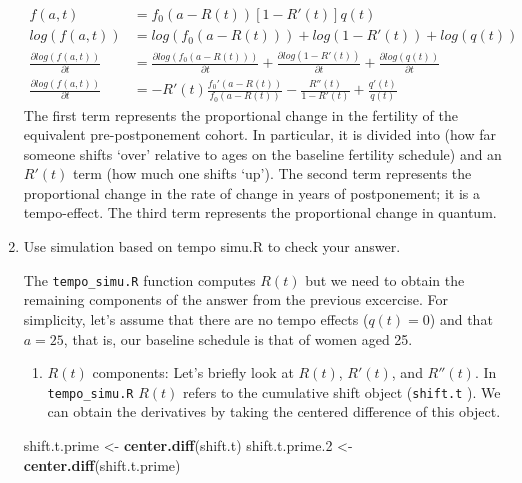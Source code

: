 \documentclass[]{book}
\newenvironment{Shaded}{\begin{snugshade}}{\end{snugshade}}
\newcommand{\FloatTok}[1]{\textcolor[rgb]{0.00,0.00,0.81}{#1}}
\newcommand{\KeywordTok}[1]{\textcolor[rgb]{0.13,0.29,0.53}{\textbf{#1}}}
\newcommand{\NormalTok}[1]{#1}
\newcommand{\StringTok}[1]{\textcolor[rgb]{0.31,0.60,0.02}{#1}}
\providecommand{\tightlist}{%
  \setlength{\itemsep}{0pt}\setlength{\parskip}{0pt}}
\begin{document}
\begin{enumerate}
\[\begin{aligned}
   f(a,t)&=f_0(a-R(t))[1-R'(t)]q(t)\\
   log(f(a,t))&=log(f_0(a-R(t))) + log(1-R'(t)) + log(q(t))\\
   \frac{\partial log(f(a,t))}{\partial t}&=\frac{\partial log(f_0(a-R(t)))}{\partial t} + \frac{\partial
   log(1-R'(t))}{\partial t} + \frac{\partial log(q(t))}{\partial t}\\
   \frac{\partial log(f(a,t))}{\partial t}&=-R'(t)\frac{f_0'(a-R(t))}{f_0(a-R(t))} -\frac{R''(t)}{1-R'(t)} + \frac{q'(t)}{q(t)}
   \end{aligned}\]
  The first term represents the proportional change in the fertility of the equivalent pre-postponement cohort. In particular, it is divided into (how far someone shifts `over' relative to ages on the baseline fertility schedule) and an \(R'(t)\) term (how much one shifts `up'). The second term represents the proportional change in the rate of change in years of postponement; it is a tempo-effect. The third term represents the proportional change in quantum.
\item
  Use simulation based on tempo simu.R to check your answer.

  The \texttt{tempo\_simu.R} function computes \(R(t)\) but we need to obtain the remaining components of the answer from the previous excercise. For simplicity, let's assume that there are no tempo effects (\(q(t)=0\)) and that \(a=25\), that is, our baseline schedule is that of women aged 25.

  \begin{enumerate}
  \def\labelenumii{\alph{enumii}.}
  \tightlist
  \item
    \(R(t)\) components:
    Let's briefly look at \(R(t)\), \(R'(t)\), and \(R''(t)\). In \texttt{tempo\_simu.R} \(R(t)\) refers to the cumulative shift object (\texttt{shift.t} ). We can obtain the derivatives by taking the centered difference of this object.
  \end{enumerate}

\begin{Shaded}
\begin{Highlighting}[]
\NormalTok{shift.t.prime <-}\StringTok{ }\KeywordTok{center.diff}\NormalTok{(shift.t)}
\NormalTok{shift.t.prime}\FloatTok{.2}\NormalTok{ <-}\StringTok{ }\KeywordTok{center.diff}\NormalTok{(shift.t.prime)}


\end{Highlighting}
\end{Shaded}
\end{enumerate}
\end{document}
